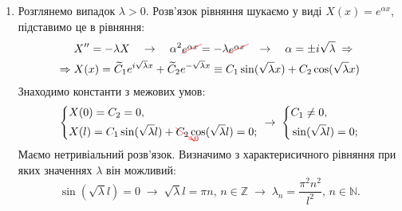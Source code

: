 \documentclass[a4paper, 14pt]{extreport}
\begin{document}
\begin{enumerate}
\begin{enumerate}
        \item Розглянемо випадок $\lambda > 0$. Розв'язок рівняння шукаємо у виді $X(x) = e^{\alpha x}$, підставимо це в рівняння: 
        \begin{equation*}
            \begin{aligned}
                &X^{\prime\prime} = -\lambda X
                \quad\to\quad
                \alpha^2 \textcolor{red}{\begin{xy}*{\textcolor{black}{e^{\alpha x}}};p+LD;+RU**h@{}+/\jot/**h@{-}\end{xy}} = -\lambda \textcolor{red}{\begin{xy}*{\textcolor{black}{e^{\alpha x}}};p+LD;+RU**h@{}+/\jot/**h@{-}\end{xy}}
                \quad\to\quad
                \alpha = \pm i\sqrt{\lambda}
                \;\Rightarrow\\
                \Rightarrow\;
                &X(x) = \widetilde{C}_1 e^{i\sqrt{\lambda}x} + \widetilde{C}_2 e^{-\sqrt{\lambda}x} \equiv C_1 \sin(\sqrt{\lambda}x) + C_2 \cos({\sqrt{\lambda}x})
            \end{aligned}
        \end{equation*}
        Знаходимо константи з межових умов:
        \begin{equation*}
            \begin{aligned}
                \left\{ \begin{aligned}
                    &X(0) = C_2 = 0, \\ 
                    &X(l) = C_1 \sin(\sqrt{\lambda}l) + \textcolor{red}{\begin{xy}*{\textcolor{black}{C_2}};p+LU;+RD**h@{}+//**h@{-}*h@{>}*h!LD{\scriptstyle 0}\end{xy}} \cos({\sqrt{\lambda}l}) = 0;
                \end{aligned} \right.
                \;\to\;
                \left\{ \begin{aligned}
                    &C_1 \neq 0, \\ 
                    &\sin(\sqrt{\lambda}l) = 0;
                \end{aligned} \right.
            \end{aligned}
        \end{equation*}
        Маємо нетривіальний розв'язок. Визначимо з характерисичного рівняння при яких значеннях $\lambda$ він можливий:
        \begin{equation*}
            \sin(\sqrt{\lambda}l) = 0
            \;\to\;
            \sqrt{\lambda}l = \pi n, \, n \in \mathbb{Z}
            \;\to\;
            \lambda_n = \frac{\pi^2 n^2}{l^2}, \, n \in \mathbb{N}.
        \end{equation*}
    \end{enumerate}
\end{enumerate} 
\end{document}
